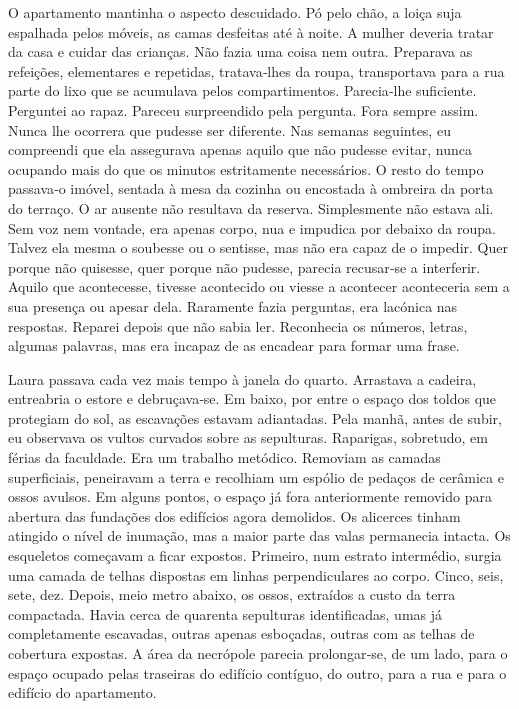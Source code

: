 O apartamento mantinha o aspecto descuidado. Pó pelo chão, a loiça suja
espalhada pelos móveis, as camas desfeitas até à noite. A mulher deveria
tratar da casa e cuidar das crianças. Não fazia uma coisa nem outra.
Preparava as refeições, elementares e repetidas, tratava­‑lhes da roupa,
transportava para a rua parte do lixo que se acumulava pelos
compartimentos. Parecia­‑lhe suficiente. Perguntei ao rapaz. Pareceu
surpreendido pela pergunta. Fora sempre assim. Nunca lhe ocorrera que
pudesse ser diferente. Nas semanas seguintes, eu compreendi que ela
assegurava apenas aquilo que não pudesse evitar, nunca ocupando mais do
que os minutos estritamente necessários. O resto do tempo passava­‑o
imóvel, sentada à mesa da cozinha ou encostada à ombreira da porta do
terraço. O ar ausente não resultava da reserva. Simplesmente não estava
ali. Sem voz nem vontade, era apenas corpo, nua e impudica por debaixo
da roupa. Talvez ela mesma o soubesse ou o sentisse, mas não era capaz
de o impedir. Quer porque não quisesse, quer porque não pudesse, parecia
recusar­‑se a interferir. Aquilo que acontecesse, tivesse acontecido ou
viesse a acontecer aconteceria sem a sua presença ou apesar dela.
Raramente fazia perguntas, era lacónica nas respostas. Reparei depois
que não sabia ler. Reconhecia os números, letras, algumas palavras, mas
era incapaz de as encadear para formar uma frase.

Laura passava cada vez mais tempo à janela do quarto. Arrastava a
cadeira, entreabria o estore e debruçava­‑se. Em baixo, por entre o
espaço dos toldos que protegiam do sol, as escavações estavam
adiantadas. Pela manhã, antes de subir, eu observava os vultos curvados
sobre as sepulturas. Raparigas, sobretudo, em férias da faculdade. Era
um trabalho metódico. Removiam as camadas superficiais, peneiravam a
terra e recolhiam um espólio de pedaços de cerâmica e ossos avulsos. Em
alguns pontos, o espaço já fora anteriormente removido para abertura das
fundações dos edifícios agora demolidos. Os alicerces tinham atingido o
nível de inumação, mas a maior parte das valas permanecia intacta. Os
esqueletos começavam a ficar expostos. Primeiro, num estrato intermédio,
surgia uma camada de telhas dispostas em linhas perpendiculares ao
corpo. Cinco, seis, sete, dez. Depois, meio metro abaixo, os ossos,
extraídos a custo da terra compactada. Havia cerca de quarenta
sepulturas identificadas, umas já completamente escavadas, outras apenas
esboçadas, outras com as telhas de cobertura expostas. A área da
necrópole parecia prolongar­‑se, de um lado, para o espaço ocupado pelas
traseiras do edifício contíguo, do outro, para a rua e para o edifício
do apartamento.

